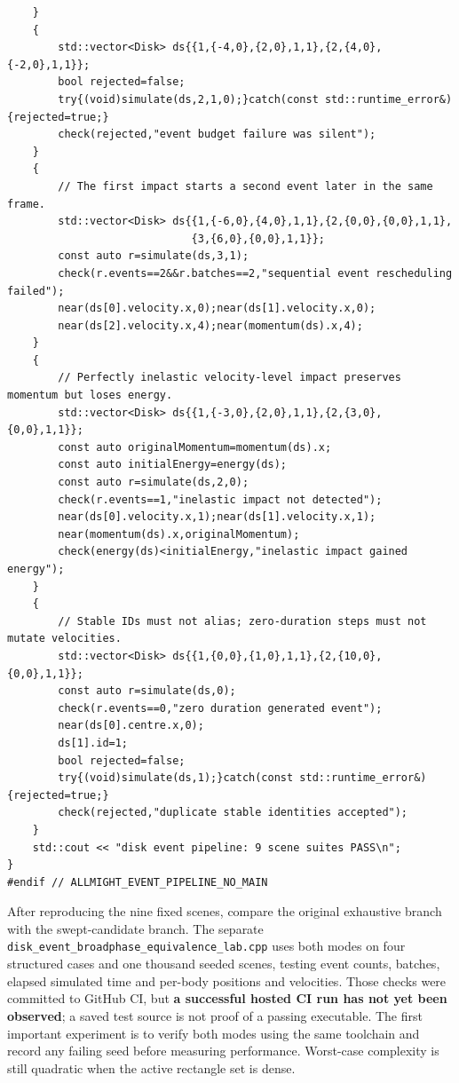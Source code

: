 \begin{verbatim}
    }
    {
        std::vector<Disk> ds{{1,{-4,0},{2,0},1,1},{2,{4,0},{-2,0},1,1}};
        bool rejected=false;
        try{(void)simulate(ds,2,1,0);}catch(const std::runtime_error&){rejected=true;}
        check(rejected,"event budget failure was silent");
    }
    {
        // The first impact starts a second event later in the same frame.
        std::vector<Disk> ds{{1,{-6,0},{4,0},1,1},{2,{0,0},{0,0},1,1},
                             {3,{6,0},{0,0},1,1}};
        const auto r=simulate(ds,3,1);
        check(r.events==2&&r.batches==2,"sequential event rescheduling failed");
        near(ds[0].velocity.x,0);near(ds[1].velocity.x,0);
        near(ds[2].velocity.x,4);near(momentum(ds).x,4);
    }
    {
        // Perfectly inelastic velocity-level impact preserves momentum but loses energy.
        std::vector<Disk> ds{{1,{-3,0},{2,0},1,1},{2,{3,0},{0,0},1,1}};
        const auto originalMomentum=momentum(ds).x;
        const auto initialEnergy=energy(ds);
        const auto r=simulate(ds,2,0);
        check(r.events==1,"inelastic impact not detected");
        near(ds[0].velocity.x,1);near(ds[1].velocity.x,1);
        near(momentum(ds).x,originalMomentum);
        check(energy(ds)<initialEnergy,"inelastic impact gained energy");
    }
    {
        // Stable IDs must not alias; zero-duration steps must not mutate velocities.
        std::vector<Disk> ds{{1,{0,0},{1,0},1,1},{2,{10,0},{0,0},1,1}};
        const auto r=simulate(ds,0);
        check(r.events==0,"zero duration generated event");
        near(ds[0].centre.x,0);
        ds[1].id=1;
        bool rejected=false;
        try{(void)simulate(ds,1);}catch(const std::runtime_error&){rejected=true;}
        check(rejected,"duplicate stable identities accepted");
    }
    std::cout << "disk event pipeline: 9 scene suites PASS\n";
}
#endif // ALLMIGHT_EVENT_PIPELINE_NO_MAIN
\end{verbatim}

After reproducing the nine fixed scenes, compare the original exhaustive branch with the swept-candidate branch. The separate \texttt{disk\_event\_broadphase\_equivalence\_lab.cpp} uses both modes on four structured cases and one thousand seeded scenes, testing event counts, batches, elapsed simulated time and per-body positions and velocities. Those checks were committed to GitHub CI, but \textbf{a successful hosted CI run has not yet been observed}; a saved test source is not proof of a passing executable. The first important experiment is to verify both modes using the same toolchain and record any failing seed before measuring performance. Worst-case complexity is still quadratic when the active rectangle set is dense.

